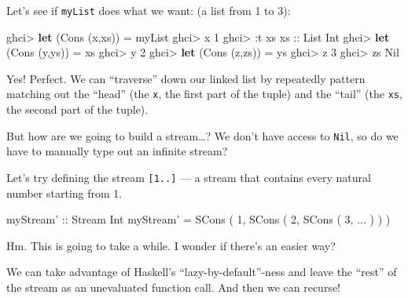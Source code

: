 \documentclass[]{article}
\newenvironment{Shaded}{\begin{snugshade}}{\end{snugshade}}
\newcommand{\DataTypeTok}[1]{\textcolor[rgb]{0.13,0.29,0.53}{#1}}
\newcommand{\DecValTok}[1]{\textcolor[rgb]{0.00,0.00,0.81}{#1}}
\newcommand{\FunctionTok}[1]{\textcolor[rgb]{0.00,0.00,0.00}{#1}}
\newcommand{\KeywordTok}[1]{\textcolor[rgb]{0.13,0.29,0.53}{\textbf{#1}}}
\newcommand{\NormalTok}[1]{#1}
\newcommand{\OtherTok}[1]{\textcolor[rgb]{0.56,0.35,0.01}{#1}}
\begin{document}
Let's see if \texttt{myList} does what we want: (a list from 1 to 3):

\begin{Shaded}
\begin{Highlighting}[]
\NormalTok{ghci}\FunctionTok{>} \KeywordTok{let}\NormalTok{ (}\DataTypeTok{Cons}\NormalTok{ (x,xs)) }\FunctionTok{=}\NormalTok{ myList}
\NormalTok{ghci}\FunctionTok{>}\NormalTok{ x}
\DecValTok{1}
\NormalTok{ghci}\FunctionTok{>} \FunctionTok{:}\NormalTok{t xs}
\OtherTok{xs ::} \DataTypeTok{List} \DataTypeTok{Int}
\NormalTok{ghci}\FunctionTok{>} \KeywordTok{let}\NormalTok{ (}\DataTypeTok{Cons}\NormalTok{ (y,ys)) }\FunctionTok{=}\NormalTok{ xs}
\NormalTok{ghci}\FunctionTok{>}\NormalTok{ y}
\DecValTok{2}
\NormalTok{ghci}\FunctionTok{>} \KeywordTok{let}\NormalTok{ (}\DataTypeTok{Cons}\NormalTok{ (z,zs)) }\FunctionTok{=}\NormalTok{ ys}
\NormalTok{ghci}\FunctionTok{>}\NormalTok{ z}
\DecValTok{3}
\NormalTok{ghci}\FunctionTok{>}\NormalTok{ zs}
\DataTypeTok{Nil}
\end{Highlighting}
\end{Shaded}

Yes! Perfect. We can ``traverse'' down our linked list by repeatedly pattern
matching out the ``head'' (the \texttt{x}, the first part of the tuple) and the
``tail'' (the \texttt{xs}, the second part of the tuple).

But how are we going to build a stream\ldots{}? We don't have access to
\texttt{Nil}, so do we have to manually type out an infinite stream?

Let's try defining the stream \texttt{{[}1..{]}} --- a stream that contains
every natural number starting from 1.

\begin{Shaded}
\begin{Highlighting}[]
\OtherTok{myStream' ::} \DataTypeTok{Stream} \DataTypeTok{Int}
\NormalTok{myStream' }\FunctionTok{=} \DataTypeTok{SCons}\NormalTok{ ( }\DecValTok{1}\NormalTok{, }\DataTypeTok{SCons}\NormalTok{ ( }\DecValTok{2}\NormalTok{, }\DataTypeTok{SCons}\NormalTok{ ( }\DecValTok{3}\NormalTok{, }\FunctionTok{...}\NormalTok{ ) ) )}
\end{Highlighting}
\end{Shaded}

Hm. This is going to take a while. I wonder if there's an easier way?

We can take advantage of Haskell's ``lazy-by-default''-ness and leave the
``rest'' of the stream as an unevaluated function call. And then we can recurse!
\end{document}
